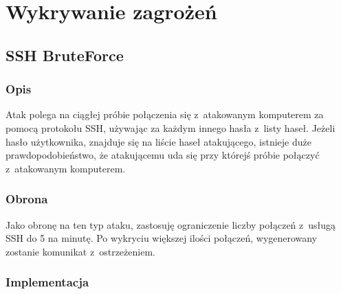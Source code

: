 \documentclass[a4paper,12pt]{book}
\begin{document}
\chapter{Wykrywanie zagrożeń}
	\section{SSH BruteForce}
		\subsection{Opis}
			Atak polega na ciągłej próbie połączenia się z~atakowanym komputerem za pomocą protokołu SSH, używając za każdym innego hasła z~listy haseł. Jeżeli hasło użytkownika, znajduje się na liście haseł atakującego, istnieje duże prawdopodobieństwo, że atakującemu uda się przy którejś próbie połączyć z~atakowanym komputerem.
		\subsection{Obrona}
			Jako obronę na ten typ ataku, zastosuję ograniczenie liczby połączeń z~usługą SSH do 5 na minutę.
			Po wykryciu większej ilości połączeń, wygenerowany zostanie komunikat z~ostrzeżeniem.
		\subsection{Implementacja}
			\scriptsize{
			}
\end{document}
